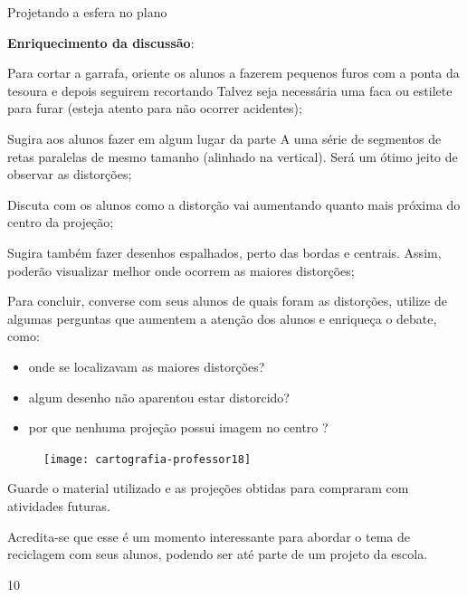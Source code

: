 \begin{Recomenda}{Projetando a esfera no plano}
{
  \textbf{Enriquecimento da discussão}:
  
  Para cortar a garrafa, oriente os alunos a fazerem pequenos furos com a ponta da tesoura e depois seguirem recortando Talvez seja necessária uma faca ou estilete para furar (esteja atento para não ocorrer acidentes);

  Sugira aos alunos fazer em algum lugar da parte A uma série de segmentos de retas paralelas de mesmo tamanho (alinhado na vertical). Será um ótimo jeito de observar as distorções;

  Discuta com os alunos como a distorção vai aumentando quanto mais próxima do centro da projeção;

  Sugira também fazer desenhos espalhados, perto das bordas e centrais. Assim, poderão visualizar melhor onde ocorrem as maiores distorções;

  Para concluir, converse com seus alunos de quais foram as distorções, utilize de algumas perguntas que aumentem a atenção dos alunos e enriqueça o debate, como:
  \begin{itemize}
  \item onde se localizavam as maiores distorções?
  \item algum desenho não aparentou estar distorcido?
  \item por que nenhuma projeção possui imagem no centro ?
  \end{itemize}

  \begin{figure}[H]
  \centering
  
  \texttt{[image: cartografia-professor18]}
  \end{figure}

  Guarde o material utilizado e as projeções obtidas para compraram com atividades futuras.

  Acredita-se que esse é um momento interessante para abordar o tema de reciclagem com seus alunos, podendo ser até parte de um projeto da escola.
  }{1}{0}
\end{Recomenda}
\label{Pplanas}


